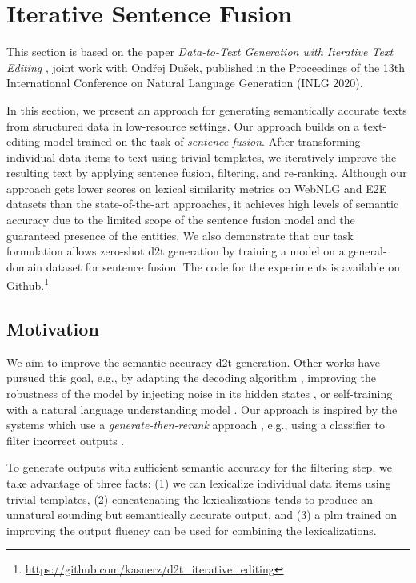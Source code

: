 \section{Iterative Sentence Fusion}
\label{sec:iterative}

\begin{refbox}
    This section is based on the paper \emph{Data-to-Text Generation with Iterative Text Editing} \cite{kasnerDatatoTextGenerationIterative2020}, joint work with Ondřej Dušek, published in the Proceedings of the 13th International Conference on Natural Language Generation (INLG 2020).
\end{refbox}

In this section, we present an approach for generating semantically accurate texts from structured data in low-resource settings. Our approach builds on a text-editing model trained on the task of \emph{sentence fusion}. After transforming individual data items to text using trivial templates, we iteratively improve the resulting text by applying sentence fusion, filtering, and re-ranking.  Although our approach gets lower scores on lexical similarity metrics on WebNLG and E2E datasets than the state-of-the-art approaches, it achieves high levels of semantic accuracy due to the limited scope of the sentence fusion model and the guaranteed presence of the entities. We also demonstrate that our task formulation allows zero-shot \ac{d2t} generation by training a model on a general-domain dataset for sentence fusion. The code for the experiments is available on Github.\footnote{\url{https://github.com/kasnerz/d2t_iterative_editing}}


\subsection{Motivation}
\label{sec:text-editing}
We aim to improve the semantic accuracy \ac{d2t} generation. Other works have pursued this goal, e.g., by adapting the decoding algorithm \cite{tianStickingFactsConfident2020}, improving the robustness of the model by injecting noise in its hidden states \cite{kedzie_good_2019}, or self-training with a natural language understanding model \cite{nieSimpleRecipeReducing2019}. Our approach is inspired by the systems which use a \emph{generate-then-rerank} approach \citep{dusekSequencetoSequenceGenerationSpoken2016,juraska_deep_2018}, e.g., using a classifier to filter incorrect outputs \cite{harkousHaveYourText2020}.

To generate outputs with sufficient semantic accuracy for the filtering step, we take advantage of three facts: (1) we can lexicalize individual data items using trivial templates, (2) concatenating the lexicalizations tends to produce an unnatural sounding but semantically accurate output, and (3) a \ac{plm} trained on improving the output fluency can be used for combining the lexicalizations.

